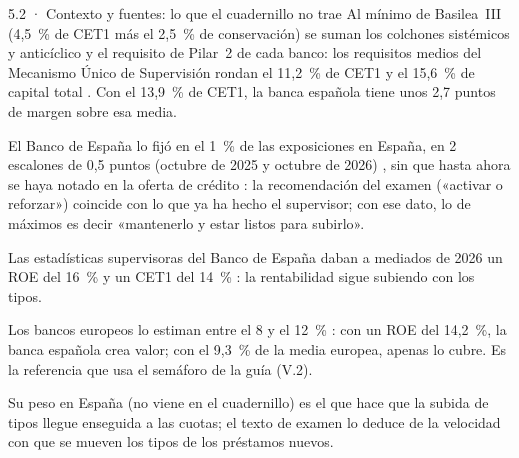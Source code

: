 \begin{complemento}{5.2 · Contexto y fuentes: lo que el cuadernillo no trae}
 Al mínimo de Basilea~III (4,5~\% de CET1 más el 2,5~\% de conservación) se suman los colchones sistémicos y anticíclico y el requisito de Pilar~2 de cada banco: los requisitos medios del Mecanismo Único de Supervisión rondan el 11,2~\% de CET1 y el 15,6~\% de capital total \parencite{BCE2025SREP,BCBS2017Basel3}. Con el 13,9~\% de CET1, la banca española tiene unos 2,7 puntos de margen sobre esa media.

 El Banco de España lo fijó en el 1~\% de las exposiciones en España, en 2 escalones de 0,5 puntos (octubre de 2025 y octubre de 2026) \parencite{BdE2025CCA}, sin que hasta ahora se haya notado en la oferta de crédito : la recomendación del examen («activar o reforzar») coincide con lo que ya ha hecho el supervisor; con ese dato, lo de máximos es decir «mantenerlo y estar listos para subirlo».

 Las estadísticas supervisoras del Banco de España daban a mediados de 2026 un ROE del 16~\% y un CET1 del 14~\% \parencite{BdE2026EstadSupervisoras}: la rentabilidad sigue subiendo con los tipos.

 Los bancos europeos lo estiman entre el 8 y el 12~\% \parencite{ABE2025RAR}: con un ROE del 14,2~\%, la banca española crea valor; con el 9,3~\% de la media europea, apenas lo cubre. Es la referencia que usa el semáforo de la guía (V.2).

 Su peso en España (no viene en el cuadernillo) es el que hace que la subida de tipos llegue enseguida a las cuotas; el texto de examen lo deduce de la velocidad con que se mueven los tipos de los préstamos nuevos.
\end{complemento}

